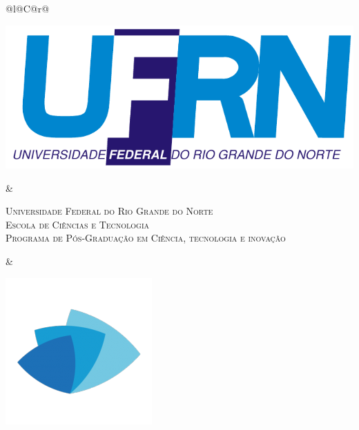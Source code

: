 %
%

\begin{titlepage}

\begin{center}

\small

\begin{tabularx}{\linewidth}{@{}l@{}C@{}r@{}}
\parbox[c]{3cm}{\includegraphics[width=\linewidth]{./figuras/UFRN}} &
\begin{center}
\textsf{\textsc{Universidade Federal do Rio Grande do Norte\\
Escola de Ciências e Tecnologia\\
Programa de Pós-Graduação em Ciência, tecnologia e inovação}}
\end{center} &
\parbox[c]{3cm}{\includegraphics[width=\linewidth]{./figuras/ppgcti-abreveatura}}
\end{tabularx}


\end{center}
\end{titlepage}

